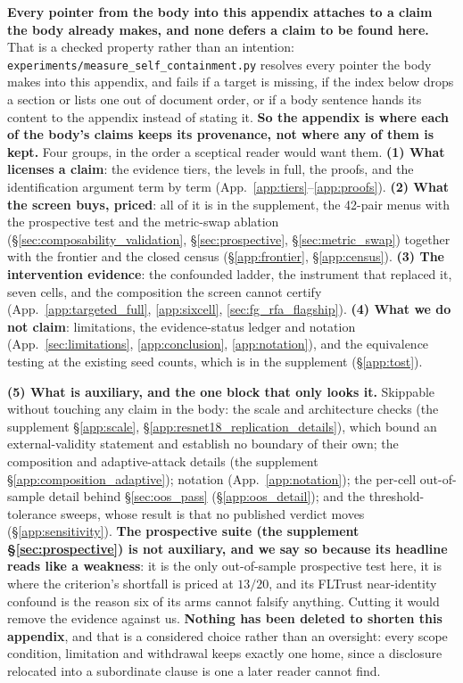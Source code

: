 \documentclass{article}
\begin{document}
\noindent \textbf{Every pointer from the body into this appendix attaches to a claim the body already
makes, and none defers a claim to be found here.} That is a checked property rather than an intention:
\texttt{experiments/\allowbreak measure\_self\_containment.py} resolves every pointer the body makes
into this appendix, and fails if a target is missing, if the index below drops a section or lists one
out of document order, or if a body sentence hands its content to the appendix instead of stating it.
\textbf{So the appendix is where each of the body's claims keeps its provenance, not where any of them
is kept.} Four groups, in the order a sceptical reader would want them. \textbf{(1) What licenses a
claim}: the evidence tiers, the levels in full, the proofs, and the identification argument term by
term (App.~\ref{app:tiers}--\ref{app:proofs}). \textbf{(2) What the screen buys, priced}: all of it is in the
supplement, the 42-pair menus with the prospective test and the metric-swap ablation
(§\ref{sec:composability_validation}, §\ref{sec:prospective}, §\ref{sec:metric_swap}) together with the
frontier and the closed census (§\ref{app:frontier}, §\ref{app:census}). \textbf{(3) The
intervention evidence}: the confounded ladder, the instrument that replaced it, seven cells, and the
composition the screen cannot certify (App.~\ref{app:targeted_full}, \ref{app:sixcell},
\ref{sec:fg_rfa_flagship}). \textbf{(4) What we do not claim}: limitations, the evidence-status ledger
and notation (App.~\ref{sec:limitations}, \ref{app:conclusion}, \ref{app:notation}), and the
equivalence testing at the existing seed counts, which is in the supplement
(§\ref{app:tost}).

\noindent \textbf{(5) What is auxiliary, and the one block that only looks it.} Skippable without
touching any claim in the body: the scale and architecture checks (the supplement §\ref{app:scale},
§\ref{app:resnet18_replication_details}), which bound an external-validity statement and establish no
boundary of their own; the composition and adaptive-attack details
(the supplement §\ref{app:composition_adaptive}); notation (App.~\ref{app:notation}); the per-cell out-of-sample
detail behind §\ref{sec:oos_pass} (§\ref{app:oos_detail}); and the threshold-tolerance sweeps, whose
result is that no published verdict moves (§\ref{app:sensitivity}). \textbf{The prospective suite
(the supplement §\ref{sec:prospective}) is not auxiliary, and we say so because its headline reads like a
weakness}: it is the only out-of-sample prospective test here, it is where the criterion's shortfall
is priced at $13/20$, and its FLTrust near-identity confound is the reason six of its arms cannot
falsify anything. Cutting it would remove the evidence against us. \textbf{Nothing has been deleted
to shorten this appendix}, and that is a considered choice rather than an oversight: every scope
condition, limitation and withdrawal keeps exactly one home, since a disclosure relocated into a
subordinate clause is one a later reader cannot find.
\end{document}
